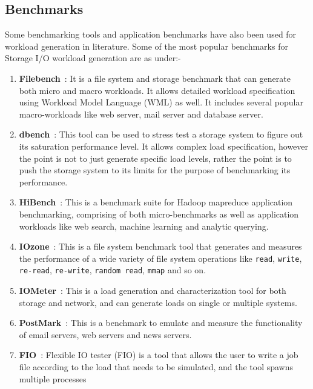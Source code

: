 \subsection{Benchmarks}
Some benchmarking 
tools and application benchmarks have also been used for
workload generation in literature. 
Some of the most popular benchmarks
for Storage I/O workload generation are as under:-
\begin{enumerate}
	\item \textbf{Filebench}~\cite{filebench}: It is a file 
		system and storage 
	      benchmark that can generate both micro and macro workloads. 
	      It allows detailed workload specification using Workload
	      Model Language (WML) as well. It includes several popular
	      macro-workloads like web server, mail server and database 
	      server.
	\item \textbf{dbench}~\cite{dbench}: This tool can be used to stress test
	      a storage system to figure out its saturation performance
	      level. It allows complex load specification, however the
	      point is not to just generate specific load levels, rather
	      the point is to push the storage system to its limits for
	      the purpose of benchmarking its performance.
	\item \textbf{HiBench}~\cite{hibench}: This is a benchmark suite
	      for Hadoop mapreduce application benchmarking,
	      comprising of both micro-benchmarks as well as application
	      workloads like web search, machine learning and analytic
	      querying.
	\item \textbf{IOzone}~\cite{iozone}: This is a file system benchmark
	      tool that generates and measures the performance of a wide
	      variety of file system operations like \texttt{read}, \texttt{write},
	      \texttt{re-read}, \texttt{re-write}, \texttt{random read},
	      \texttt{mmap} and so on.
	\item \textbf{IOMeter}~\cite{iometer}: This is a load generation and
	      characterization tool for both storage and network, and can
	      generate loads on single or multiple systems.
	\item \textbf{PostMark}~\cite{postmark}: This is a benchmark to 
	      emulate and measure the functionality of email servers, 
		  web servers and news servers.
	\item \textbf{FIO}~\cite{fio}: Flexible IO tester (FIO) is a tool that 
		  allows the user to write a job file according to the load that 
		  needs to be simulated, and the tool spawns multiple processes

\end{enumerate}
